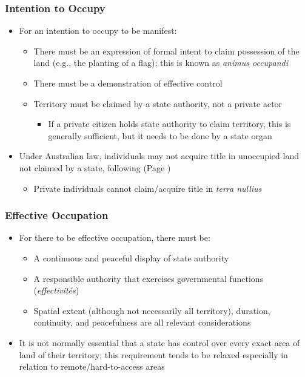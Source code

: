 \subsubsection{Intention to Occupy}

\begin{itemize}
    \item For an intention to occupy to be manifest:
    \begin{itemize}
        \item There must be an expression of formal intent to claim possession of the land (e.g., the planting of a flag); this is known as \textit{animus occupandi}
        \item There must be a demonstration of effective control
        \item Territory must be claimed by a state authority, not a private actor
        \begin{itemize}
            \item If a private citizen holds state authority to claim territory, this is generally sufficient, but it needs to be done by a state organ
        \end{itemize}
    \end{itemize}
    \item Under Australian law, individuals may not acquire title in unoccupied land not claimed by a state, following  (Page \pageref{case:Ure v Commonwealth})
    \begin{itemize}
        \item Private individuals cannot claim/acquire title in \textit{terra nullius}
    \end{itemize}
\end{itemize}

\subsubsection{Effective Occupation}
\begin{itemize}
    \item For there to be effective occupation, there must be:
    \begin{itemize}
        \item A continuous and peaceful display of state authority
        \item A responsible authority that exercises governmental functions (\textit{effectivités})
        \item Spatial extent (although not necessarily all territory), duration, continuity, and peacefulness are all relevant considerations
    \end{itemize}
    \item It is not normally essential that a state has control over every exact area of land of their territory; this requirement tends to be relaxed especially in relation to remote/hard-to-access areas
\end{itemize}

